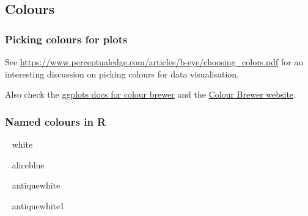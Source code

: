 \documentclass[]{article}
\newenvironment{Shaded}{\begin{snugshade}}{\end{snugshade}}
\newcommand{\KeywordTok}[1]{\textcolor[rgb]{0.13,0.29,0.53}{\textbf{#1}}}
\newcommand{\DecValTok}[1]{\textcolor[rgb]{0.00,0.00,0.81}{#1}}
\newcommand{\CharTok}[1]{\textcolor[rgb]{0.31,0.60,0.02}{#1}}
\newcommand{\StringTok}[1]{\textcolor[rgb]{0.31,0.60,0.02}{#1}}
\newcommand{\ControlFlowTok}[1]{\textcolor[rgb]{0.13,0.29,0.53}{\textbf{#1}}}
\newcommand{\OperatorTok}[1]{\textcolor[rgb]{0.81,0.36,0.00}{\textbf{#1}}}
\newcommand{\NormalTok}[1]{#1}
\theoremstyle{definition}
\theoremstyle{definition}
\theoremstyle{definition}
\theoremstyle{remark}
\begin{document}
\subsection*{Colours}\label{colours}

\subsubsection*{Picking colours for plots}\label{picking-colours}

See
\url{https://www.perceptualedge.com/articles/b-eye/choosing_colors.pdf}
for an interesting discussion on picking colours for data visualisation.

Also check the
\href{http://ggplot2.tidyverse.org/reference/scale_brewer.html}{ggplots
docs for colour brewer} and the \href{http://colorbrewer2.org/}{Colour
Brewer website}.

\hypertarget{named-colours}{\subsubsection*{Named colours in
R}\label{named-colours}}

\begin{Shaded}
\end{Shaded}

{~} white

{~} aliceblue

{~} antiquewhite

{~} antiquewhite1
\end{document}

